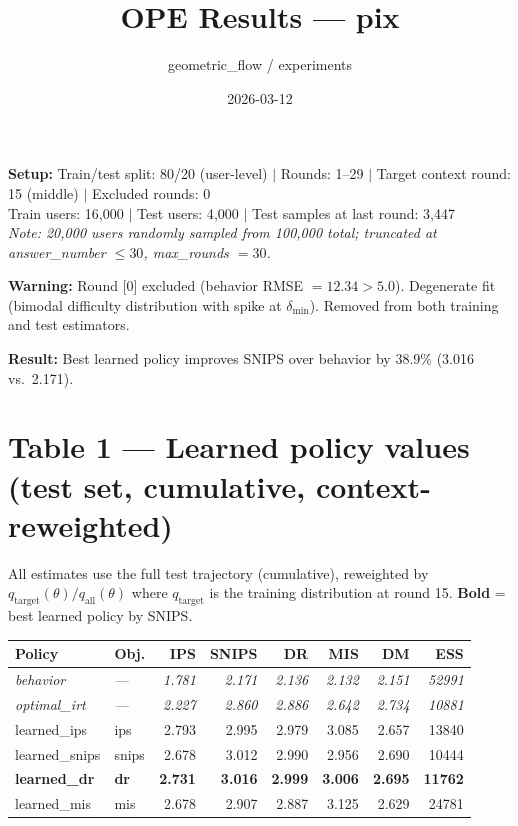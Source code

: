 \documentclass[11pt]{article}
\title{\textbf{OPE Results --- pix}}
\date{2026-03-12}
\author{geometric\_flow / experiments}
\begin{document}
\maketitle

\noindent\textbf{Setup:}
Train/test split: 80/20 (user-level) $|$
Rounds: 1--29 $|$
Target context round: 15 (middle) $|$
Excluded rounds: 0\\
Train users: 16{,}000 $|$ Test users: 4{,}000 $|$ Test samples at last round: 3{,}447\\
\textit{Note: 20{,}000 users randomly sampled from 100{,}000 total; truncated at answer\_number $\leq 30$, max\_rounds $= 30$.}

\bigskip
\noindent\colorbox{warnbg}{\parbox{0.97\textwidth}{%
\textbf{Warning:} Round [0] excluded (behavior RMSE $= 12.34 > 5.0$). Degenerate fit
(bimodal difficulty distribution with spike at $\delta_{\min}$).
Removed from both training and test estimators.}}

\medskip
\noindent\colorbox{goodbg}{\parbox{0.97\textwidth}{%
\textbf{Result:} Best learned policy improves SNIPS over behavior by 38.9\% (3.016 vs.\ 2.171).}}

\section*{Table 1 — Learned policy values (test set, cumulative, context-reweighted)}

{\small All estimates use the full test trajectory (cumulative), reweighted by
$q_{\text{target}}(\theta) / q_{\text{all}}(\theta)$ where $q_{\text{target}}$ is the
training distribution at round 15. \textbf{Bold} = best learned policy by SNIPS.}

\bigskip
\begin{tabular}{llrrrrrr}
\toprule
\textbf{Policy} & \textbf{Obj.} & \textbf{IPS} & \textbf{SNIPS} & \textbf{DR} & \textbf{MIS} & \textbf{DM} & \textbf{ESS} \\
\midrule
\rowcolor{behbg}
\textit{behavior} & \textit{---} & \textit{1.781} & \textit{2.171} & \textit{2.136} & \textit{2.132} & \textit{2.151} & \textit{52991} \\
\rowcolor{oraclebg}
\textit{optimal\_irt} & \textit{---} & \textit{2.227} & \textit{2.860} & \textit{2.886} & \textit{2.642} & \textit{2.734} & \textit{10881} \\
learned\_ips & ips & 2.793 & 2.995 & 2.979 & 3.085 & 2.657 & 13840 \\
learned\_snips & snips & 2.678 & 3.012 & 2.990 & 2.956 & 2.690 & 10444 \\
\textbf{learned\_dr} & \textbf{dr} & \textbf{2.731} & \textbf{3.016} & \textbf{2.999} & \textbf{3.006} & \textbf{2.695} & \textbf{11762} \\
learned\_mis & mis & 2.678 & 2.907 & 2.887 & 3.125 & 2.629 & 24781 \\
\bottomrule
\end{tabular}
\end{document}
